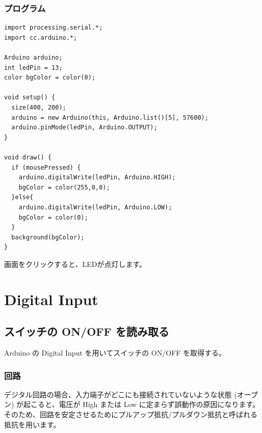 \documentclass[11pt,a4paper]{jarticle}
\begin{document}
\subsubsection*{プログラム}
\begin{lstlisting}
import processing.serial.*;
import cc.arduino.*;
 
Arduino arduino;
int ledPin = 13;
color bgColor = color(0);
 
void setup() {
  size(400, 200);
  arduino = new Arduino(this, Arduino.list()[5], 57600);
  arduino.pinMode(ledPin, Arduino.OUTPUT);
}
 
void draw() {
  if (mousePressed) {
    arduino.digitalWrite(ledPin, Arduino.HIGH);
    bgColor = color(255,0,0);
  }else{
    arduino.digitalWrite(ledPin, Arduino.LOW);
    bgColor = color(0);
  }
  background(bgColor);
}
\end{lstlisting}
画面をクリックすると、LEDが点灯します。

\newpage

\section{Digital Input}
\subsection{スイッチの ON/OFF を読み取る}
Arduino の Digital Input を用いてスイッチの ON/OFF を取得する。

\subsubsection*{回路}
デジタル回路の場合、入力端子がどこにも接続されていないような状態 (オープン) が起こると、電圧が High または Low に定まらず誤動作の原因になります。
そのため、回路を安定させるためにプルアップ抵抗/プルダウン抵抗と呼ばれる抵抗を用います。
\end{document}
